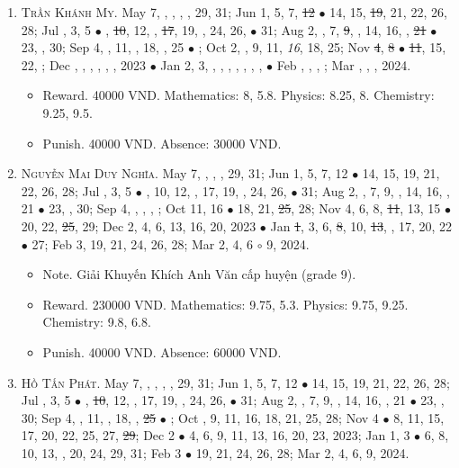 \documentclass{article}
\begin{document}
\begin{enumerate}
\begin{itemize}
	\end{itemize}
	\item \textsc{Trần Khánh My.} May 7, , , , , 29, 31; Jun 1, 5, 7, \st{12} $\bullet$ 14, 15, \st{19}, 21, 22, 26, 28; Jul , 3, 5 $\bullet$ , \st{10}, 12, , \st{17}, 19, , 24, 26,  $\bullet$ 31; Aug 2, , 7, \st{9}, , 14, 16, , \st{21} $\bullet$ 23, , 30; Sep 4, , 11, , 18, , 25 $\bullet$ ; Oct 2, , 9, 11, {\it16}, 18, 25; Nov \st{4}, \st{8} $\bullet$ \st{11}, 15, 22, ; Dec , , , , , , 2023 $\bullet$ Jan 2, 3, , , , , , , ,  $\bullet$ Feb , , , ; Mar , , , 2024.
	\begin{itemize}
		\item {\sf Reward.} 40000 VND. Mathematics: 8, 5.8. Physics: 8.25, 8. Chemistry: 9.25, 9.5.
		\item {\sf Punish.} 40000 VND. Absence: 30000 VND.
	\end{itemize}
	\item \textsc{Nguyễn Mai Duy Nghĩa.} May 7, , , , 29, 31; Jun 1, 5, 7, 12 $\bullet$ 14, 15, 19, 21, 22, 26, 28; Jul , 3, 5 $\bullet$ , 10, 12, , 17, 19, , 24, 26,  $\bullet$ 31; Aug 2, , 7, 9, , 14, 16, , 21 $\bullet$ 23, , 30; Sep 4, , , , ; Oct 11, 16 $\bullet$ 18, 21, \st{25}, 28; Nov 4, 6, 8, \st{11}, 13, 15 $\bullet$ 20, 22, \st{25}, 29; Dec 2, 4, 6, 13, 16, 20, 2023 $\bullet$ Jan \st{1}, 3, 6, \st{8}, 10, \st{13}, , 17, 20, 22 $\bullet$ 27; Feb 3, 19, 21, 24, 26, 28; Mar 2, 4, 6 $\circ$ 9, 2024.
	\begin{itemize}
		\item {\sf Note.} Giải Khuyến Khích Anh Văn cấp huyện (grade 9).
		\item {\sf Reward.} 230000 VND. Mathematics: 9.75, 5.3. Physics: 9.75, 9.25. Chemistry: 9.8, 6.8.
		\item {\sf Punish.} 40000 VND. Absence: 60000 VND.
	\end{itemize}
	\item \textsc{Hồ Tấn Phát.} May 7, , , , , 29, 31; Jun 1, 5, 7, 12 $\bullet$ 14, 15, 19, 21, 22, 26, 28; Jul , 3, 5 $\bullet$ , \st{10}, 12, , 17, 19, , 24, 26,  $\bullet$ 31; Aug 2, , 7, 9, , 14, 16, , 21 $\bullet$ 23, , 30; Sep 4, , 11, , 18, , \st{25} $\bullet$ ; Oct , 9, 11, 16, 18, 21, 25, 28; Nov 4 $\bullet$ 8, 11, 15, 17, 20, 22, 25, 27, \st{29}; Dec 2 $\bullet$ 4, 6, 9, 11, 13, 16, 20, 23, 2023; Jan 1, 3 $\bullet$ 6, 8, 10, 13, , 20, 24, 29, 31; Feb 3 $\bullet$ 19, 21, 24, 26, 28; Mar 2, 4, 6, 9, 2024.

\end{enumerate}
\end{document}
